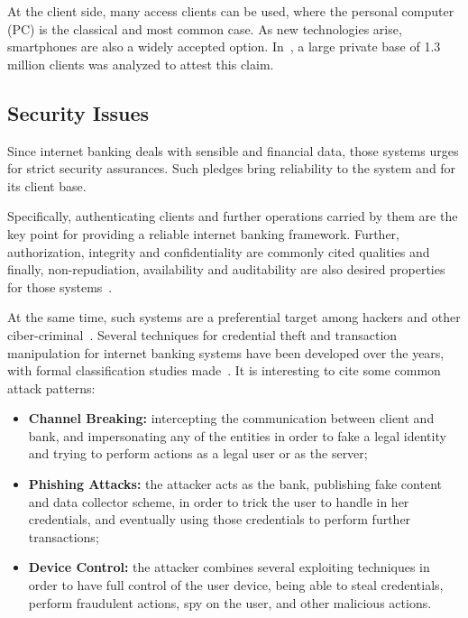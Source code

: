 At the client side, many access clients can be used, where the personal computer (PC) is the classical and most common case. As new technologies arise, smartphones are also a widely accepted option. In~\cite{Peotta2012}, a large private base of 1.3 million clients was analyzed to attest this claim.

\subsection{Security Issues}
Since internet banking deals with sensible and financial data, those systems urges for strict security assurances. Such pledges bring reliability to the system and for its client base.

Specifically, authenticating clients and further operations carried by them are the key point for providing a reliable internet banking framework. Further, authorization, integrity and confidentiality are commonly cited qualities and finally, non-repudiation, availability and auditability are also desired properties for those systems~\cite{Hutchinson2003}.

At the same time, such systems are a preferential target among hackers and other ciber-criminal~\cite{Peotta2011, Hutchinson2003}. Several techniques for credential theft and transaction manipulation for internet banking systems have been developed over the years, with formal classification studies made~\cite{Peotta2011, Adham2013}. It is interesting to cite some common attack patterns:

\begin{itemize}
  \item \textbf{Channel Breaking:} intercepting the communication between client and bank, and impersonating any of the entities in order to fake a legal identity and trying to perform actions as a legal user or as the server;

  \item \textbf{Phishing Attacks:} the attacker acts as the bank, publishing fake content and data collector scheme, in order to trick the user to handle in her credentials, and eventually using those credentials to perform further transactions;

  \item \textbf{Device Control:} the attacker combines several exploiting techniques in order to have full control of the user device, being able to steal credentials, perform fraudulent actions, spy on the user, and other malicious actions.
\end{itemize}

